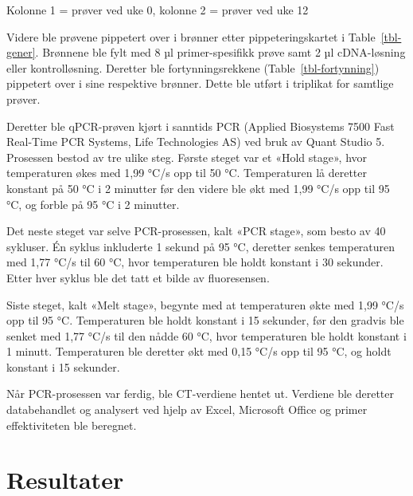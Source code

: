 \documentclass[
  letterpaper,
  DIV=11,
  numbers=noendperiod]{scrreprt}
\begin{document}
\begin{minipage}{\linewidth}
Kolonne 1 = prøver ved uke 0, kolonne 2 = prøver ved uke 12\\
\end{minipage}
\endgroup

Videre ble prøvene pippetert over i brønner etter pippeteringskartet i
Table~\ref{tbl-gener}. Brønnene ble fylt med 8 µl primer-spesifikk prøve
samt 2 µl cDNA-løsning eller kontrolløsning. Deretter ble
fortynningsrekkene (Table~\ref{tbl-fortynning}) pippetert over i sine
respektive brønner. Dette ble utført i triplikat for samtlige prøver.

Deretter ble qPCR-prøven kjørt i sanntids PCR (Applied Biosystems 7500
Fast Real-Time PCR Systems, Life Technologies AS) ved bruk av Quant
Studio 5. Prosessen bestod av tre ulike steg. Første steget var et «Hold
stage», hvor temperaturen økes med 1,99 °C/s opp til 50 °C. Temperaturen
lå deretter konstant på 50 °C i 2 minutter før den videre ble økt med
1,99 °C/s opp til 95 °C, og forble på 95 °C i 2 minutter.

Det neste steget var selve PCR-prosessen, kalt «PCR stage», som besto av
40 sykluser. Én syklus inkluderte 1 sekund på 95 °C, deretter senkes
temperaturen med 1,77 °C/s til 60 °C, hvor temperaturen ble holdt
konstant i 30 sekunder. Etter hver syklus ble det tatt et bilde av
fluoresensen.

Siste steget, kalt «Melt stage», begynte med at temperaturen økte med
1,99 °C/s opp til 95 °C. Temperaturen ble holdt konstant i 15 sekunder,
før den gradvis ble senket med 1,77 °C/s til den nådde 60 °C, hvor
temperaturen ble holdt konstant i 1 minutt. Temperaturen ble deretter
økt med 0,15 °C/s opp til 95 °C, og holdt konstant i 15 sekunder.

Når PCR-prosessen var ferdig, ble CT-verdiene hentet ut. Verdiene ble
deretter databehandlet og analysert ved hjelp av Excel, Microsoft Office
og primer effektiviteten ble beregnet.

\section{Resultater}\label{resultater-1}

\begingroup
\fontsize{12.0pt}{14.4pt}\selectfont
\setlength{\LTpost}{0mm}
\end{document}
